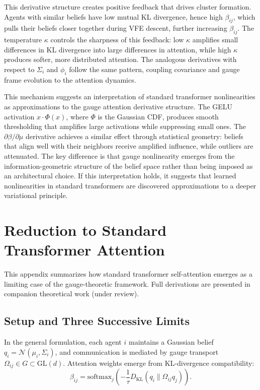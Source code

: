 \documentclass[twoside,11pt]{article}
\begin{document}
This derivative structure creates positive feedback that drives cluster formation. Agents with similar beliefs have low mutual KL divergence, hence high $\beta_{ij}$, which pulls their beliefs closer together during VFE descent, further increasing $\beta_{ij}$. The temperature $\kappa$ controls the sharpness of this feedback: low $\kappa$ amplifies small differences in KL divergence into large differences in attention, while high $\kappa$ produces softer, more distributed attention. The analogous derivatives with respect to $\Sigma_i$ and $\phi_i$ follow the same pattern, coupling covariance and gauge frame evolution to the attention dynamics.

This mechanism suggests an interpretation of standard transformer nonlinearities as approximations to the gauge attention derivative structure. The GELU activation $x \cdot \Phi(x)$, where $\Phi$ is the Gaussian CDF, produces smooth thresholding that amplifies large activations while suppressing small ones. The $\partial \beta / \partial \mu$ derivative achieves a similar effect through statistical geometry: beliefs that align well with their neighbors receive amplified influence, while outliers are attenuated. The key difference is that gauge nonlinearity emerges from the information-geometric structure of the belief space rather than being imposed as an architectural choice. If this interpretation holds, it suggests that learned nonlinearities in standard transformers are discovered approximations to a deeper variational principle.


\section{Reduction to Standard Transformer Attention}
\label{app:transformer_reduction}

This appendix summarizes how standard transformer self-attention emerges as a limiting case of the gauge-theoretic framework. Full derivations are presented in companion theoretical work (under review).

\subsection{Setup and Three Successive Limits}

In the general formulation, each agent $i$ maintains a Gaussian belief $q_i = \mathcal{N}(\mu_i, \Sigma_i)$, and communication is mediated by gauge transport $\Omega_{ij} \in G \subset \mathrm{GL}(d)$. Attention weights emerge from KL-divergence compatibility:
\begin{equation}
\beta_{ij} = \mathrm{softmax}_j\left(-\frac{1}{\tau} D_{\mathrm{KL}}(q_i \| \Omega_{ij} q_j)\right).
\end{equation}
\end{document}
